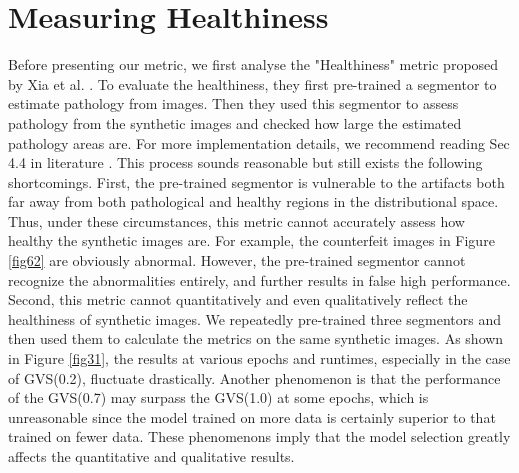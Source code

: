 \documentclass[journal,twoside,web]{ieeecolor}
\begin{document}
\section{Measuring Healthiness} \label{sec4}
Before presenting our metric, we first analyse the "Healthiness" metric proposed by Xia et al. \cite{xia2020pseudo}. To evaluate the healthiness, they first pre-trained a segmentor to estimate pathology from images. Then they used this segmentor to assess pathology from the synthetic images and checked how large the estimated pathology areas are. For more implementation details, we recommend reading Sec 4.4 in literature \cite{xia2020pseudo}. This process sounds reasonable but still exists the following shortcomings. First, the pre-trained segmentor is vulnerable to the artifacts both far away from both pathological and healthy regions in the distributional space. Thus, under these circumstances, this metric cannot accurately assess how healthy the synthetic images are. For example, the counterfeit images in Figure \ref{fig62} are obviously abnormal. However, the pre-trained segmentor cannot recognize the abnormalities entirely, and further results in false high performance. Second, this metric cannot quantitatively and even qualitatively reflect the healthiness of synthetic images. We repeatedly pre-trained three segmentors and then used them to calculate the metrics on the same synthetic images. As shown in Figure \ref{fig31}, the results at various epochs and runtimes, especially in the case of GVS(0.2), fluctuate drastically. Another phenomenon is that the performance of the GVS(0.7) may surpass the GVS(1.0) at some epochs, which is unreasonable since the model trained on more data is certainly superior to that trained on fewer data. These phenomenons imply that the model selection greatly affects the quantitative and qualitative results.
\end{document}
